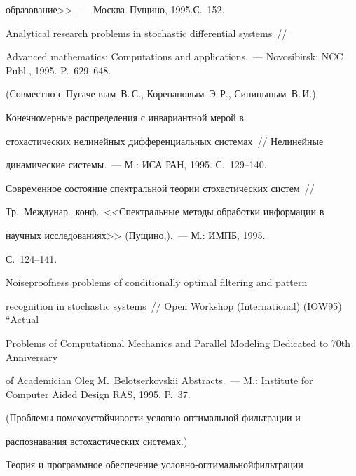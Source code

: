 образование>>.~--- Москва--Пущино, 1995.\linebreak С.~152.





Analytical research problems in stochastic differential systems~//


Advanced mathematics: Computations and applications.~--- Novosibirsk: NCC Publ., 1995. P.~629--648.


(Совместно с Пугаче-\linebreak вым~В.\,С., Корепановым~Э.\,Р., Синицыным~В.\,И.)





Конечномерные распределения с инвариантной мерой в


стохастических нелинейных дифференциальных системах~// Нелинейные


динамические системы.~--- М.: ИСА РАН, 1995. С.~129--140.





 Современное состояние спектральной теории стохастических систем~//


Тр.\ Междунар.\ конф.\ <<Спектральные методы обработки информации в


научных исследованиях>> (Пущино,).~--- М.: ИМПБ, 1995.


С.~124--141.





Noiseproofness problems of conditionally optimal filtering and pattern


recognition in stochastic systems~// Open Workshop (International) (IOW95) ``Actual


Problems of Computational Mechanics and Parallel Modeling Dedicated to 70th Anniversary


of Academician Oleg M.~Belotserkovskii Abstracts.~--- M.: Institute for Computer Aided Design RAS, 1995. P.~37.


(Проблемы помехоустой\-чивости условно-оптимальной фильтрации и


распознавания в\linebreak стохастических системах.)





 Теория и программное обеспечение условно-оптимальной\linebreak фильтрации


